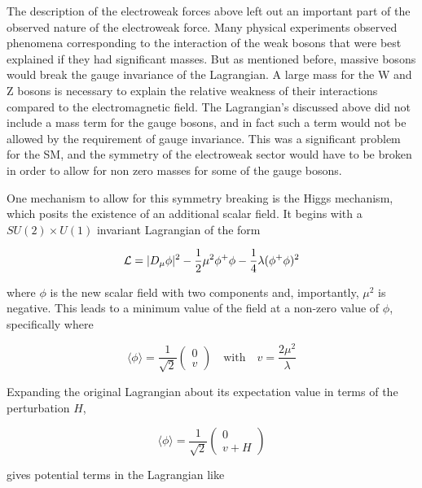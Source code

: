 The description of the electroweak forces above left out an important part of the observed nature of the electroweak force.
Many physical experiments observed phenomena corresponding to the interaction of the weak bosons that were best explained if they had significant masses.
But as mentioned before, massive bosons would break the gauge invariance of the Lagrangian.
A large mass for the W and Z bosons is necessary to explain the relative weakness of their interactions compared to the electromagnetic field.
The Lagrangian's discussed above did not include a mass term for the gauge bosons, and in fact such a term would not be allowed by the requirement of gauge invariance. 
This was a significant problem for the \ac{SM}, and the symmetry of the electroweak sector would have to be broken in order to allow for non zero masses for some of the gauge bosons.

One mechanism to allow for this symmetry breaking is the Higgs mechanism, which posits the existence of an additional scalar field.
It begins with a $SU(2)\times U(1)$ invariant Lagrangian of the form 

\begin{equation}
  \mathcal{L} = |D_\mu\phi|^2 - \frac{1}{2}\mu^2\phi^+\phi - \frac{1}{4}\lambda(\phi^+\phi)^2
\end{equation}

\noindent where $\phi$ is the new scalar field with two components and, importantly, $\mu^2$ is negative.
This leads to a minimum value of the field at a non-zero value of $\phi$, specifically where

\begin{equation}
 \langle \phi \rangle = \frac{1}{\sqrt{2}} \begin{pmatrix}0\\v\end{pmatrix} \quad \mathrm{with} \quad v = \frac{2\mu^2}{\lambda}
\end{equation}

\noindent Expanding the original Lagrangian about its expectation value in terms of the perturbation $H$,

\begin{equation}
  \langle \phi \rangle = \frac{1}{\sqrt{2}} \begin{pmatrix}0\\v + H\end{pmatrix}
\end{equation}

\noindent gives potential terms in the Lagrangian like 

